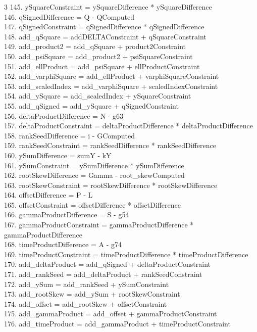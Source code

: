 \documentclass[10pt]{article}
\begin{document}
\begin{multicols}{3}
145. ySquareConstraint = ySquareDifference * ySquareDifference\\
146. qSignedDifference = Q - QComputed\\
147. qSignedConstraint = qSignedDifference * qSignedDifference\\
148. add\_qSquare = addDELTAConstraint + qSquareConstraint\\
149. add\_product2 = add\_qSquare + product2Constraint\\
150. add\_psiSquare = add\_product2 + psiSquareConstraint\\
151. add\_ellProduct = add\_psiSquare + ellProductConstraint\\
152. add\_varphiSquare = add\_ellProduct + varphiSquareConstraint\\
153. add\_scaledIndex = add\_varphiSquare + scaledIndexConstraint\\
154. add\_ySquare = add\_scaledIndex + ySquareConstraint\\
155. add\_qSigned = add\_ySquare + qSignedConstraint\\
156. deltaProductDifference = N - g63\\
157. deltaProductConstraint = deltaProductDifference * deltaProductDifference\\
158. rankSeedDifference = i - GComputed\\
159. rankSeedConstraint = rankSeedDifference * rankSeedDifference\\
160. ySumDifference = sumY - kY\\
161. ySumConstraint = ySumDifference * ySumDifference\\
162. rootSkewDifference = Gamma - root\_skewComputed\\
163. rootSkewConstraint = rootSkewDifference * rootSkewDifference\\
164. offsetDifference = P - L\\
165. offsetConstraint = offsetDifference * offsetDifference\\
166. gammaProductDifference = S - g54\\
167. gammaProductConstraint = gammaProductDifference * gammaProductDifference\\
168. timeProductDifference = A - g74\\
169. timeProductConstraint = timeProductDifference * timeProductDifference\\
170. add\_deltaProduct = add\_qSigned + deltaProductConstraint\\
171. add\_rankSeed = add\_deltaProduct + rankSeedConstraint\\
172. add\_ySum = add\_rankSeed + ySumConstraint\\
173. add\_rootSkew = add\_ySum + rootSkewConstraint\\
174. add\_offset = add\_rootSkew + offsetConstraint\\
175. add\_gammaProduct = add\_offset + gammaProductConstraint\\
176. add\_timeProduct = add\_gammaProduct + timeProductConstraint\\
\end{multicols}
\end{document}
